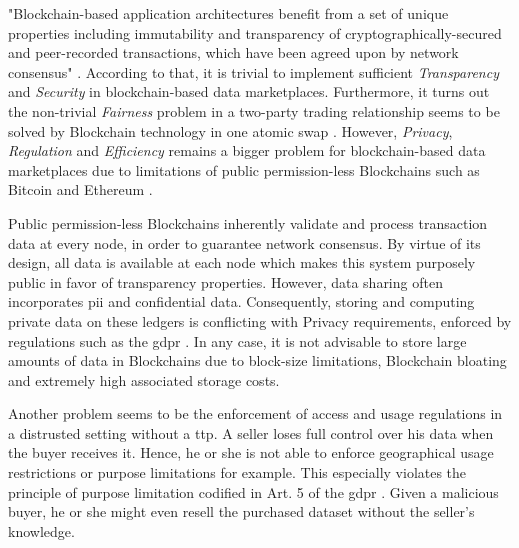 "Blockchain-based application architectures benefit from a set of unique properties including immutability and transparency of cryptographically-secured and peer-recorded transactions, which have been agreed upon by network consensus" \cite{eberhardtBlockchainInsightsOffChaining2017}. According to that, it is trivial to implement sufficient \emph{Transparency} and \emph{Security} in blockchain-based data marketplaces. Furthermore, it turns out the non-trivial \emph{Fairness} problem in a two-party trading relationship seems to be solved by Blockchain technology in one atomic swap \cite{dziembowskiFairSwapHowFairly2018,liZKCPlusOptimizedFairexchange2021}. However, \emph{Privacy}, \emph{Regulation} and \emph{Efficiency} remains a bigger problem for blockchain-based data marketplaces due to limitations of public permission-less Blockchains such as Bitcoin \cite{nakamotoBitcoinPeertoPeerElectronic} and Ethereum \cite{buterinNEXTGENERATIONSMART}.

Public permission-less Blockchains inherently validate and process transaction data at every node, in order to guarantee network consensus. By virtue of its design, all data is available at each node which makes this system purposely public in favor of transparency properties. However, data sharing often incorporates \acrfull{pii} and confidential data. Consequently, storing and computing private data on these ledgers is conflicting with Privacy requirements, enforced by regulations such as the \acrfull{gdpr} \cite{european_commission_regulation_2016}. In any case, it is not advisable to store large amounts of data in Blockchains due to block-size limitations, Blockchain bloating and extremely high associated storage costs.


Another problem seems to be the enforcement of access and usage regulations in a distrusted setting without a \acrfull{ttp}. A seller loses full control over his data when the buyer receives it. Hence, he or she is not able to enforce geographical usage restrictions or purpose limitations for example. This especially violates the principle of purpose limitation codified in Art. 5 of the \acrshort{gdpr} \cite[Art. 5 (1 b)]{european_commission_regulation_2016}. Given a malicious buyer, he or she might even resell the purchased dataset without the seller's knowledge.


